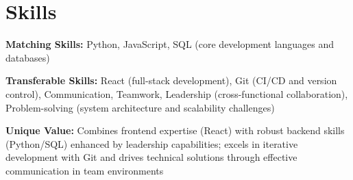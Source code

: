 \section{Skills}
\begin{onecolentry}
\begin{highlights}
\item \textbf{Matching Skills:} Python, JavaScript, SQL (core development languages and databases)
\item \textbf{Transferable Skills:} React (full-stack development), Git (CI/CD and version control), Communication, Teamwork, Leadership (cross-functional collaboration), Problem-solving (system architecture and scalability challenges)
\item \textbf{Unique Value:} Combines frontend expertise (React) with robust backend skills (Python/SQL) enhanced by leadership capabilities; excels in iterative development with Git and drives technical solutions through effective communication in team environments
\end{highlights}
\end{onecolentry}